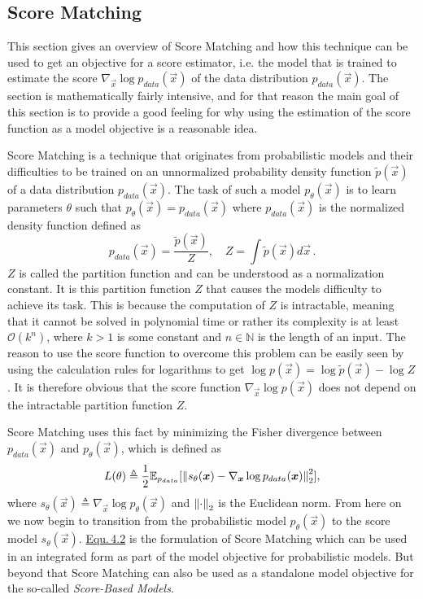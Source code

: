 \subsection{Score Matching} \label{sec:4.1.1}
This section gives an overview of Score Matching and how this technique can be used to get an objective for a score estimator, i.e. the model that is trained to estimate the score $\nabla_{\vec{x}}\log p_{data}(\vec{x})$ of the data distribution $p_{data}(\vec{x})$. The section is mathematically fairly intensive, and for that reason the main goal of this section is to provide a good feeling for why using the estimation of the score function as a model objective is a reasonable idea.

Score Matching \cite{score_matching_original} is a technique that originates from probabilistic models and their difficulties to be trained on an unnormalized probability density function $\tilde{p}(\vec{x})$ of a data distribution $p_{data}(\vec{x})$. The task of such a model $p_\theta(\vec{x})$ is to learn parameters $\theta$ such that $p_\theta(\vec{x})=p_{data}(\vec{x})$ where $p_{data}(\vec{x})$ is the normalized density function defined as
%
\begin{equation}
    p_{data}(\vec{x})=\frac{\tilde{p}(\vec{x})}{Z},\quad Z=\int\tilde{p}(\vec{x})d\vec{x}\,.
\end{equation}
%
$Z$ is called the partition function and can be understood as a normalization constant. It is this partition function $Z$ that causes the models difficulty to achieve its task. This is because the computation of $Z$ is intractable, meaning that it cannot be solved in polynomial time or rather its complexity is at least $\mathcal{O}(k^n)$, where $k>1$ is some constant and $n\in\mathbb{N}$ is the length of an input. The reason to use the score function to overcome this problem can be easily seen by using the calculation rules for logarithms to get $\log p(\vec{x})=\log\tilde{p}(\vec{x})-\log Z$. It is therefore obvious that the score function $\nabla_{\vec{x}}\log p(\vec{x})$ does not depend on the intractable partition function $Z$.

Score Matching uses this fact by minimizing the Fisher divergence between $p_{data}(\vec{x})$ and $p_\theta(\vec{x})$, which is defined as
%
\begin{equation} \label{equ:4.2}
    L(\theta)\triangleq\frac{1}{2}\mathbb{E}_{p_{data}}[\left\lVert s_\theta(\boldsymbol{x})-\nabla_{\boldsymbol{x}}\log p_{data}(\boldsymbol{x})\right\rVert^2_2],
\end{equation}
%
where $s_\theta(\vec{x})\triangleq\nabla_{\vec{x}}\log p_\theta(\vec{x})$ and $\left\lVert\cdot\right\rVert_2$ is the Euclidean norm. From here on we now begin to transition from the probabilistic model $p_\theta(\vec{x})$ to the score model $s_\theta(\vec{x})$. \hyperref[equ:4.2]{Equ.\,4.2} is the formulation of Score Matching which can be used in an integrated form as part of the model objective for probabilistic models. But beyond that Score Matching can also be used as a standalone model objective for the so-called \textit{Score-Based Models}.

